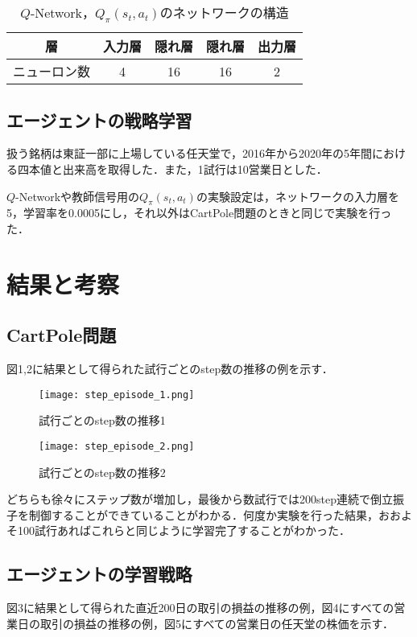 \documentclass[twocolumn]{jarticle}
\begin{document}
        \begin{table}
            \caption{$Q$-Network，$Q_\pi(s_t,a_t)$のネットワークの構造}
            \begin{tabular}{|c|c|c|c|c|} \hline
                層 & 入力層 & 隠れ層 & 隠れ層 & 出力層 \\ \hline
                ニューロン数 & 4 & 16 & 16 & 2 \\ \hline
            \end{tabular}
        \end{table}
        
        \subsection{エージェントの戦略学習}
        扱う銘柄は東証一部に上場している任天堂で，2016年から2020年の5年間における四本値と出来高を取得した．また，1試行は10営業日とした．
        
        $Q$-Networkや教師信号用の$Q_\pi(s_t,a_t)$の実験設定は，ネットワークの入力層を5，学習率を0.0005にし，それ以外はCartPole問題のときと同じで実験を行った．
    
\section{結果と考察}
        \subsection{CartPole問題}
        図1,2に結果として得られた試行ごとのstep数の推移の例を示す．

        \begin{figure}
            \texttt{[image: step\_episode\_1.png]}
            \caption{試行ごとのstep数の推移1}
        \end{figure}

        \begin{figure}
            \texttt{[image: step\_episode\_2.png]}
            \caption{試行ごとのstep数の推移2}
        \end{figure}

        どちらも徐々にステップ数が増加し，最後から数試行では200step連続で倒立振子を制御することができていることがわかる．何度か実験を行った結果，おおよそ100試行あればこれらと同じように学習完了することがわかった．

        \subsection{エージェントの学習戦略}
        図3に結果として得られた直近200日の取引の損益の推移の例，図4にすべての営業日の取引の損益の推移の例，図5にすべての営業日の任天堂の株価を示す．
\end{document}
